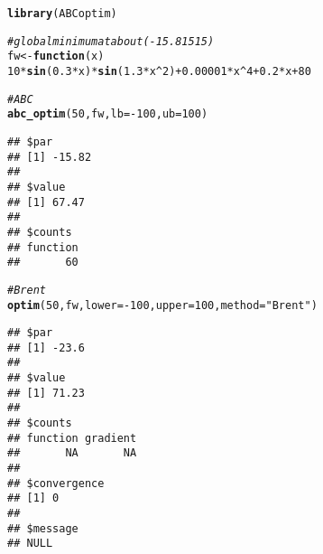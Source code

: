 \documentclass{article}\usepackage[]{graphicx}\usepackage[]{color}
\makeatletter
\newcommand{\hlnum}[1]{\textcolor[rgb]{0.686,0.059,0.569}{#1}}%
\newcommand{\hlstr}[1]{\textcolor[rgb]{0.192,0.494,0.8}{#1}}%
\newcommand{\hlcom}[1]{\textcolor[rgb]{0.678,0.584,0.686}{\textit{#1}}}%
\newcommand{\hlopt}[1]{\textcolor[rgb]{0,0,0}{#1}}%
\newcommand{\hlstd}[1]{\textcolor[rgb]{0.345,0.345,0.345}{#1}}%
\newcommand{\hlkwa}[1]{\textcolor[rgb]{0.161,0.373,0.58}{\textbf{#1}}}%
\newcommand{\hlkwb}[1]{\textcolor[rgb]{0.69,0.353,0.396}{#1}}%
\newcommand{\hlkwc}[1]{\textcolor[rgb]{0.333,0.667,0.333}{#1}}%
\newcommand{\hlkwd}[1]{\textcolor[rgb]{0.737,0.353,0.396}{\textbf{#1}}}%
\newenvironment{kframe}{%
 \def\at@end@of@kframe{}%
 \ifinner\ifhmode%
  \def\at@end@of@kframe{\end{minipage}}%
  \begin{minipage}{\columnwidth}%
 \fi\fi%
 \def\FrameCommand##1{\hskip\@totalleftmargin \hskip-\fboxsep
 \colorbox{shadecolor}{##1}\hskip-\fboxsep
     \hskip-\linewidth \hskip-\@totalleftmargin \hskip\columnwidth}%
 \MakeFramed {\advance\hsize-\width
   \@totalleftmargin\z@ \linewidth\hsize
   \@setminipage}}%
 {\par\unskip\endMakeFramed%
 \at@end@of@kframe}
\newenvironment{knitrout}{}{} %
\makeatother
\begin{document}
\begin{knitrout}
\color{fgcolor}\begin{kframe}
\begin{alltt}
\hlkwd{library}\hlstd{(ABCoptim)}

\hlcom{# global minimum at about (-15.81515)}
\hlstd{fw} \hlkwb{<-} \hlkwa{function} \hlstd{(}\hlkwc{x}\hlstd{)}
  \hlnum{10}\hlopt{*}\hlkwd{sin}\hlstd{(}\hlnum{0.3}\hlopt{*}\hlstd{x)}\hlopt{*}\hlkwd{sin}\hlstd{(}\hlnum{1.3}\hlopt{*}\hlstd{x}\hlopt{^}\hlnum{2}\hlstd{)} \hlopt{+} \hlnum{0.00001}\hlopt{*}\hlstd{x}\hlopt{^}\hlnum{4} \hlopt{+} \hlnum{0.2}\hlopt{*}\hlstd{x}\hlopt{+}\hlnum{80}

\hlcom{# ABC}
\hlkwd{abc_optim}\hlstd{(}\hlnum{50}\hlstd{, fw,} \hlkwc{lb}\hlstd{=}\hlopt{-}\hlnum{100}\hlstd{,} \hlkwc{ub}\hlstd{=}\hlnum{100}\hlstd{)}
\end{alltt}
\begin{verbatim}
## $par
## [1] -15.82
## 
## $value
## [1] 67.47
## 
## $counts
## function 
##       60
\end{verbatim}
\begin{alltt}
\hlcom{# Brent}
\hlkwd{optim}\hlstd{(}\hlnum{50}\hlstd{, fw,} \hlkwc{lower}\hlstd{=}\hlopt{-}\hlnum{100}\hlstd{,}\hlkwc{upper}\hlstd{=}\hlnum{100}\hlstd{,} \hlkwc{method}\hlstd{=}\hlstr{"Brent"}\hlstd{)}
\end{alltt}
\begin{verbatim}
## $par
## [1] -23.6
## 
## $value
## [1] 71.23
## 
## $counts
## function gradient 
##       NA       NA 
## 
## $convergence
## [1] 0
## 
## $message
## NULL
\end{verbatim}
\end{kframe}
\end{knitrout}
\end{document}
